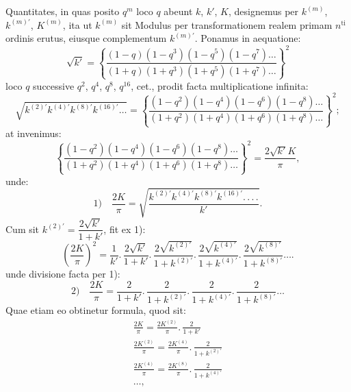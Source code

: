 \documentclass{article}
\begin{document}
Quantitates, in quas posito $q^{m}$ loco $q$ abeunt $k$, $k'$, $K$, designemus per $k^{(m)}$, $k^{(m)\prime}$, $K^{(m)}$, ita ut $k^{(m)}$ sit Modulus per transformationem realem primam $n^{\mathrm{ti}}$ ordinis erutus, eiusque complementum $k^{(m)\prime}$. Ponamus in aequatione:
\[
\sqrt{k'}=\left\{\frac{(1-q)(1-q^{3})(1-q^{5})(1-q^{7})\ldots}{(1+q)(1+q^{3})(1+q^{5})(1+q^{7})\ldots}\right\}^{2}
\]
loco $q$ successive $q^{2}$, $q^{4}$, $q^{8}$, $q^{16}$, cet., prodit facta multiplicatione infinita:
\[
\sqrt{k^{(2)\prime}k^{(4)\prime}k^{(8)\prime}k^{(16)\prime}\ldots}=\left\{\frac{(1-q^{2})(1-q^{4})(1-q^{6})(1-q^{8})\ldots}{(1+q^{2})(1+q^{4})(1+q^{6})(1+q^{8})\ldots}\right\}^{2};
\]
at invenimus:
\[
\left\{\frac{(1-q^{2})(1-q^{4})(1-q^{6})(1-q^{8})\ldots}{(1+q^{2})(1+q^{4})(1+q^{6})(1+q^{8})\ldots}\right\}^{2}=\frac{2\sqrt{k'}K}{\pi},
\]
unde:
\[
\text{1)}\quad\frac{2K}{\pi}=\sqrt{\frac{k^{(2)\prime}k^{(4)\prime}k^{(8)\prime}k^{(16)\prime}.\,.\,.\,.}{k'}}.
\]
Cum sit $k^{(2)\prime}=\dfrac{2\sqrt{k'}}{1+k'}$, fit ex 1):
\[
\left(\frac{2K}{\pi}\right)^{2}=\frac{1}{k'}.\,\frac{2\sqrt{k'}}{1+k'}.\,\frac{2\sqrt{k^{(2)\prime}}}{1+k^{(2)\prime}}.\,\frac{2\sqrt{k^{(4)\prime}}}{1+k^{(4)\prime}}.\,\frac{2\sqrt{k^{(8)\prime}}}{1+k^{(8)\prime}}\ldots.
\]
unde divisione facta per 1):
\[
\text{2)}\quad\frac{2K}{\pi}=\frac{2}{1+k'}.\,\frac{2}{1+k^{(2)\prime}}.\,\frac{2}{1+k^{(4)\prime}}.\,\frac{2}{1+k^{(8)\prime}}\ldots
\]
Quae etiam eo obtinetur formula, quod sit:
\[
\begin{gathered}
\frac{2K}{\pi}=\frac{2K^{(2)}}{\pi}.\,\frac{2}{1+k'}
\\[2ex]
\frac{2K^{(2)}}{\pi}=\frac{2K^{(4)}}{\pi}.\,\frac{2}{1+k^{(2)\prime}}
\\[2ex]
\frac{2K^{(4)}}{\pi}=\frac{2K^{(8)}}{\pi}.\,\frac{2}{1+k^{(4)\prime}}
\\[2ex]
\ldots,
\end{gathered}
\]
\end{document}
